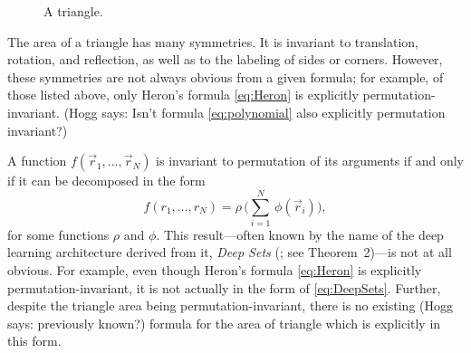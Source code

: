 \documentclass[12pt]{article}
\newcommand{\CH}[1]{{\color{blue} (CH says: #1)}}
\newcommand{\Hogg}[1]{{\color{violet} (Hogg says: #1)}}
\newcommand{\pseudosection}[1]
{}
\begin{document}
\begin{figure}[t!]
    \caption{A triangle.}
    \label{fig:triangle}
\end{figure}

The area of a triangle has many symmetries. It is invariant to translation, rotation, and reflection, as well as to the labeling of sides or corners. However, these symmetries are not always obvious from a given formula; for example, of those listed above, only Heron's formula \eqref{eq:Heron} is explicitly permutation-invariant. \Hogg{Isn't formula \eqref{eq:polynomial} also explicitly permutation invariant?}


\pseudosection{Deep Sets}

A function $f(\vec{r}_1, \dots, \vec{r}_N)$ is invariant to permutation of its arguments if and only if it can be decomposed in the form
\begin{equation}
    f(r_1, \dots, r_N) = \rho \, \big( \sum_{i=1}^{N} \, \phi(\vec{r}_i) \big), \label{eq:DeepSets}
\end{equation}
for some functions $\rho$ and $\phi$. This result---often known by the name of the deep learning architecture derived from it, \emph{Deep Sets} (\citealt{zaheer+17deepsets}; see Theorem~2)---is not at all obvious.
For example, even though Heron's formula \eqref{eq:Heron} is explicitly permutation-invariant, it is not actually in the form of \eqref{eq:DeepSets}. 
Further, despite the triangle area being permutation-invariant, there is no existing \Hogg{previously known?} formula for the area of triangle which is explicitly in this form.
\end{document}
